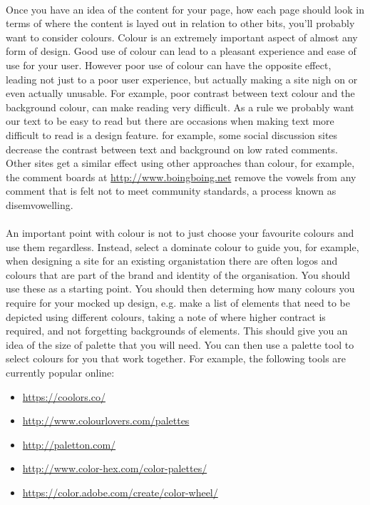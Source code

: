 \documentclass[10pt, a4paper, twosize]{article}
\begin{document}
\paragraph{} Once you have an idea of the content for your page, how each page should look in terms of where the content is layed out in relation to other bits, you'll probably want to consider colours. Colour is an extremely important aspect of almost any form of design. Good use of colour can lead to a pleasant experience and ease of use for your user. However poor use of colour can have the opposite effect, leading not just to a poor user experience, but actually making a site nigh on or even actually unusable. For example, poor contrast between text colour and the background colour, can make reading very difficult. As a rule we probably want our text to be easy to read but there are occasions when making text more difficult to read is a design feature. for example, some social discussion sites decrease the contrast between text and background on low rated comments. Other sites get a similar effect using other approaches than colour, for example, the comment boards at \url{http://www.boingboing.net} remove the vowels from any comment that is felt not to meet community standards, a process known as disemvowelling.

\paragraph{} An important point with colour is not to just choose your favourite colours and use them regardless. Instead, select a dominate colour to guide you, for example, when designing a site for an existing organistation there are often logos and colours that are part of the brand and identity of the organisation. You should use these as a starting point. You should then determing how many colours you require for your mocked up design, e.g. make a list of elements that need to be depicted using different colours, taking a note of where higher contract is required, and not forgetting backgrounds of elements. This should give you an idea of the size of palette that you will need. You can then use a palette tool to select colours for you that work together. For example, the following tools are currently popular online:

\begin{itemize}
\item \url{https://coolors.co/}
\item \url{http://www.colourlovers.com/palettes}
\item \url{http://paletton.com/}
\item \url{http://www.color-hex.com/color-palettes/}
\item \url{https://color.adobe.com/create/color-wheel/}
\end{itemize}
\end{document}
